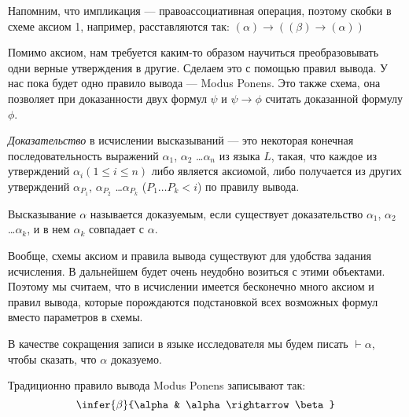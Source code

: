 Напомним, что импликация --- правоассоциативная операция, поэтому
скобки в схеме аксиом 1, например, расставляются так:
$(\alpha) \rightarrow ((\beta) \rightarrow (\alpha))$

Помимо аксиом, нам требуется каким-то образом научиться преобразовывать одни верные утверждения
в другие.
Сделаем это с помощью правил вывода. У нас пока будет одно правило вывода --- Modus Ponens.
Это также схема, она позволяет при доказанности двух формул $\psi$ и $\psi \rightarrow \phi$
считать доказанной формулу $\phi$.

\begin{definition} \emph{Доказательство} в исчислении высказываний --- 
это некоторая конечная последовательность выражений 
$\alpha_1$, $\alpha_2$ \dots $\alpha_n$
из языка $L$, такая, что каждое из утверждений $\alpha_i (1 \le i \le n)$
либо является аксиомой, либо получается из других
утверждений $\alpha_{P_1}$, $\alpha_{P_2}$ \dots $\alpha_{P_k}$ 
($P_1 \dots P_k < i$) по правилу вывода.
\end{definition}

\begin{definition} Высказывание $\alpha$ называется доказуемым, если 
существует доказательство $\alpha_1$, $\alpha_2$ \dots $\alpha_k$, и в нем
$\alpha_k$ совпадает с $\alpha$. 
\end{definition}

Вообще, схемы аксиом и правила вывода существуют для удобства задания
исчисления. В дальнейшем будет очень неудобно возиться с этими объектами.
Поэтому мы считаем, что в исчислении имеется бесконечно много аксиом и правил вывода,
которые порождаются подстановкой всех возможных формул вместо параметров в схемы.

В качестве сокращения записи в языке исследователя мы будем писать $\vdash \alpha$,
чтобы сказать, что $\alpha$ доказуемо.

Традиционно правило вывода Modus Ponens записывают так:
$$\infer{\beta}{\alpha & \alpha \rightarrow \beta}$$
